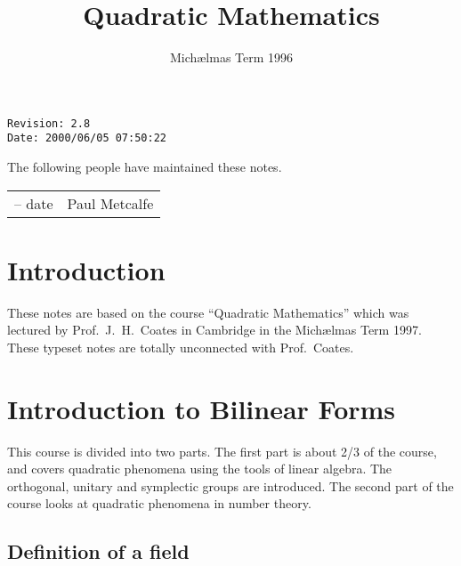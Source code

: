 \documentclass{notes}
\theoremstyle{plain}
\begin{document}
\frontmatter
\title{Quadratic Mathematics}

\date{Mich\ae lmas Term 1996}


\maketitle

\thispagestyle{empty}

\noindent\verb$Revision: 2.8 $\hfill\\
\noindent\verb$Date: 2000/06/05 07:50:22 $\hfill\\

\vspace{1.5in}

The following people have maintained these notes.

\begin{center}
\begin{tabular}{ r  l}
-- date & Paul Metcalfe
\end{tabular}
\end{center}

\tableofcontents

\chapter{Introduction}

These notes are based on the course ``Quadratic Mathematics'' which was
lectured by Prof.~J.~H.~Coates in Cambridge in the Mich\ae lmas Term 1997.
These typeset notes are totally unconnected with Prof.~Coates.

\alsoavailable
\archimcopyright

\mainmatter

\chapter{Introduction to Bilinear Forms}

This course is divided into two parts.  The first part is about 2/3 of
the course, and covers quadratic phenomena using the tools of linear
algebra.  The orthogonal, unitary and symplectic groups are
introduced.  The second part of the course looks at quadratic
phenomena in number theory.

\section{Definition of a field}
\end{document}
